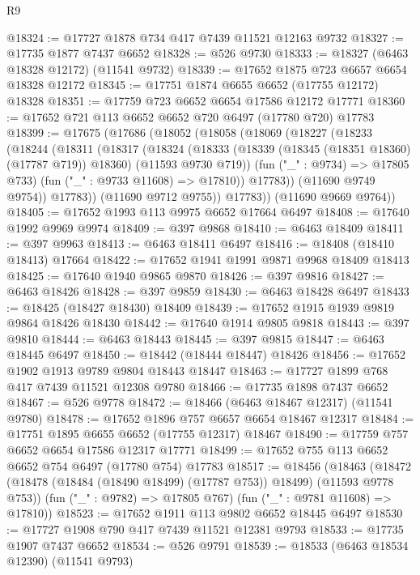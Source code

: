 \begin{lexlean}{R9}
\begin{coremodule}
@18324 := @17727 @1878 @734 @417 @7439 @11521 @12163 @9732
@18327 := @17735 @1877 @7437 @6652
@18328 := @526 @9730
@18333 := @18327 (@6463 @18328 @12172) (@11541 @9732)
@18339 := @17652 @1875 @723 @6657 @6654 @18328 @12172
@18345 := @17751 @1874 @6655 @6652 (@17755 @12172) @18328
@18351 := @17759 @723 @6652 @6654 @17586 @12172 @17771
@18360 := @17652 @721 @113 @6652 @6652 @720 @6497 (@17780 @720) @17783
@18399 := @17675
    (@17686
      (@18052
        (@18058
          (@18069
            (@18227
              (@18233
                (@18244
                  (@18311
                    (@18317
                      (@18324
                        (@18333
                          (@18339 (@18345 (@18351 @18360) (@17787 @719)) @18360)
                          (@11593 @9730 @719))
                        (fun ("_" : @9734) => @17805 @733)
                        (fun ("_" : @9733 @11608) => @17810))
                      @17783))
                  (@11690 @9749 @9754))
                @17783))
            (@11690 @9712 @9755))
          @17783))
      (@11690 @9669 @9764))
@18405 := @17652 @1993 @113 @9975 @6652 @17664 @6497
@18408 := @17640 @1992 @9969 @9974
@18409 := @397 @9868
@18410 := @6463 @18409
@18411 := @397 @9963
@18413 := @6463 @18411 @6497
@18416 := @18408 (@18410 @18413) @17664
@18422 := @17652 @1941 @1991 @9871 @9968 @18409 @18413
@18425 := @17640 @1940 @9865 @9870
@18426 := @397 @9816
@18427 := @6463 @18426
@18428 := @397 @9859
@18430 := @6463 @18428 @6497
@18433 := @18425 (@18427 @18430) @18409
@18439 := @17652 @1915 @1939 @9819 @9864 @18426 @18430
@18442 := @17640 @1914 @9805 @9818
@18443 := @397 @9810
@18444 := @6463 @18443
@18445 := @397 @9815
@18447 := @6463 @18445 @6497
@18450 := @18442 (@18444 @18447) @18426
@18456 := @17652 @1902 @1913 @9789 @9804 @18443 @18447
@18463 := @17727 @1899 @768 @417 @7439 @11521 @12308 @9780
@18466 := @17735 @1898 @7437 @6652
@18467 := @526 @9778
@18472 := @18466 (@6463 @18467 @12317) (@11541 @9780)
@18478 := @17652 @1896 @757 @6657 @6654 @18467 @12317
@18484 := @17751 @1895 @6655 @6652 (@17755 @12317) @18467
@18490 := @17759 @757 @6652 @6654 @17586 @12317 @17771
@18499 := @17652 @755 @113 @6652 @6652 @754 @6497 (@17780 @754) @17783
@18517 := @18456
    (@18463
      (@18472 (@18478 (@18484 (@18490 @18499) (@17787 @753)) @18499) (@11593 @9778 @753))
      (fun ("_" : @9782) => @17805 @767)
      (fun ("_" : @9781 @11608) => @17810))
@18523 := @17652 @1911 @113 @9802 @6652 @18445 @6497
@18530 := @17727 @1908 @790 @417 @7439 @11521 @12381 @9793
@18533 := @17735 @1907 @7437 @6652
@18534 := @526 @9791
@18539 := @18533 (@6463 @18534 @12390) (@11541 @9793)

\end{coremodule}
\end{lexlean}
